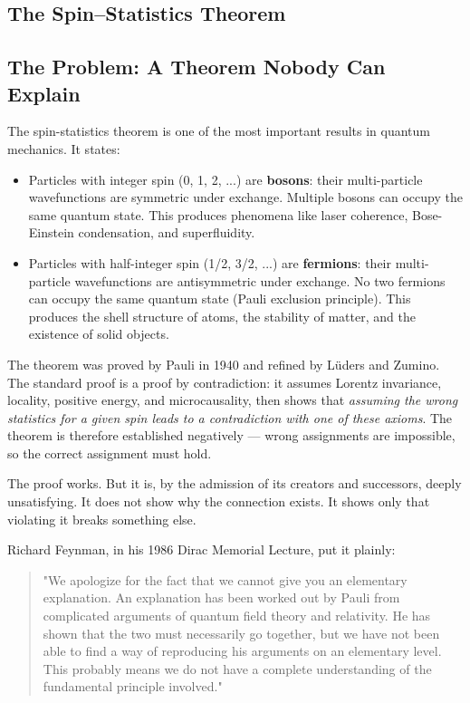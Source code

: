 \documentclass[aps,prd,preprint,superscriptaddress,longbibliography,floatfix]{revtex4-2}
\theoremstyle{remark}
\begin{document}
\subsection{The Spin--Statistics Theorem}



\subsection{The Problem: A Theorem Nobody Can Explain}

The spin-statistics theorem is one of the most important results in quantum mechanics. It states:


\begin{itemize}
  \item Particles with integer spin (0, 1, 2, ...) are \textbf{bosons}: their multi-particle wavefunctions are symmetric under exchange. Multiple bosons can occupy the same quantum state. This produces phenomena like laser coherence, Bose-Einstein condensation, and superfluidity.
  \item Particles with half-integer spin (1/2, 3/2, ...) are \textbf{fermions}: their multi-particle wavefunctions are antisymmetric under exchange. No two fermions can occupy the same quantum state (Pauli exclusion principle). This produces the shell structure of atoms, the stability of matter, and the existence of solid objects.
\end{itemize}

The theorem was proved by Pauli in 1940 and refined by L\"{u}ders and Zumino. The standard proof is a proof by contradiction: it assumes Lorentz invariance, locality, positive energy, and microcausality, then shows that \textit{assuming the wrong statistics for a given spin leads to a contradiction with one of these axioms}. The theorem is therefore established negatively --- wrong assignments are impossible, so the correct assignment must hold.

The proof works. But it is, by the admission of its creators and successors, deeply unsatisfying. It does not show why the connection exists. It shows only that violating it breaks something else.

Richard Feynman, in his 1986 Dirac Memorial Lecture, put it plainly:


\begin{quote}
"We apologize for the fact that we cannot give you an elementary explanation.
An explanation has been worked out by Pauli from complicated arguments of
quantum field theory and relativity. He has shown that the two must necessarily
go together, but we have not been able to find a way of reproducing his
arguments on an elementary level. This probably means we do not have a
complete understanding of the fundamental principle involved."
\end{quote}
\end{document}
